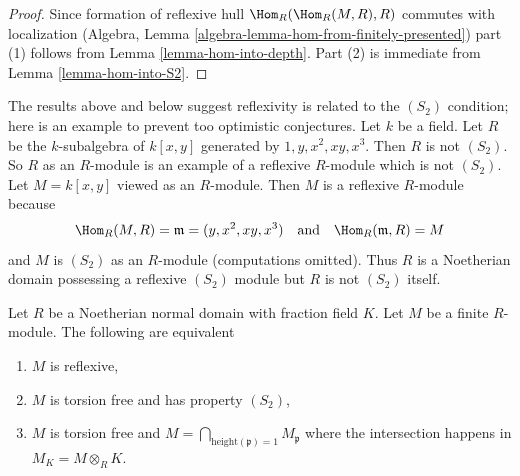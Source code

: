 \begin{proof}
Since formation of reflexive hull $\Hom_R(\Hom_R(M, R), R)$
commutes with localization
(Algebra, Lemma \ref{algebra-lemma-hom-from-finitely-presented})
part (1) follows from Lemma \ref{lemma-hom-into-depth}.
Part (2) is immediate from Lemma \ref{lemma-hom-into-S2}.
\end{proof}

\begin{example}
\label{example-ring-not-S2}
The results above and below suggest reflexivity is related to the $(S_2)$
condition; here is an example to prevent too optimistic conjectures.
Let $k$ be a field. Let $R$ be the $k$-subalgebra of $k[x, y]$
generated by $1, y, x^2, xy, x^3$. Then $R$ is not $(S_2)$. So
$R$ as an $R$-module is an example of a reflexive $R$-module
which is not $(S_2)$. Let $M = k[x, y]$ viewed as an $R$-module.
Then $M$ is a reflexive $R$-module because
$$
\Hom_R(M, R) = \mathfrak m = (y, x^2, xy, x^3)
\quad\text{and}\quad
\Hom_R(\mathfrak m, R) = M
$$
and $M$ is $(S_2)$ as an $R$-module (computations omitted).
Thus $R$ is a Noetherian domain possessing
a reflexive $(S_2)$ module but $R$ is not $(S_2)$ itself.
\end{example}

\begin{lemma}
\label{lemma-reflexive-over-normal}
Let $R$ be a Noetherian normal domain with fraction field $K$.
Let $M$ be a finite $R$-module. The following are equivalent
\begin{enumerate}
\item $M$ is reflexive,
\item $M$ is torsion free and has property $(S_2)$,
\item $M$ is torsion free and
$M = \bigcap_{\text{height}(\mathfrak p) = 1} M_{\mathfrak p}$
where the intersection happens in $M_K = M \otimes_R K$.
\end{enumerate}
\end{lemma}

